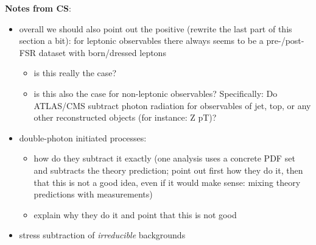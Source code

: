 \clearpage
\noindent
\textbf{Notes from CS}:
\begin{itemize}
\item overall we should also point out the positive (rewrite the last part of this section a bit): for leptonic observables there always seems to be a pre-/post-FSR dataset with born/dressed leptons
\begin{itemize}
\item is this really the case?
\item is this also the case for non-leptonic observables? Specifically: Do ATLAS/CMS subtract photon radiation for observables of jet, top, or any other reconstructed objects (for instance: Z pT)?
\end{itemize}
\item double-photon initiated processes:
\begin{itemize}
\item how do they subtract it exactly (one analysis uses a concrete PDF set and subtracts the theory prediction; point out first how they do it, then that this is not a good idea, even if it would make sense: mixing theory predictions with measurements)
\item explain why they do it and point that this is not good
\end{itemize}
\item stress subtraction of \emph{irreducible} backgrounds
\end{itemize}
